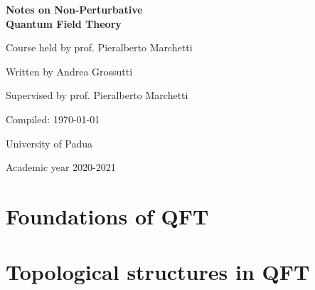 \documentclass[a4paper]{report}
\newcommand{\onlyinsubfile}[1]{#1}
\newcommand{\onlyinmainfile}[1]{

\skipline

\textsf{\color{red} Part of the text is omitted from the compiled subfile, in order to make the compilation faster. You can find it in the main file. To avoid this, remove `` \textnormal{\textbackslash onlyinmainfile\{\ldots\}}'' from the code.}

\skipline

}
\begin{document}
\renewcommand{\onlyinsubfile}[1]{}
\renewcommand{\onlyinmainfile}[1]{#1}

\renewcommand{\todo}[1]{}

\begin{titlepage}
\begin{center}
       \vspace*{5cm}
       \textbf{\Huge Notes on Non-Perturbative\\[0.3em]
       Quantum Field Theory}
       
       \vspace{1cm}
        {\LARGE Course held by prof. Pieralberto Marchetti}
        
        \vspace{1.5cm}
        {\Large Written by Andrea Grossutti} 
        
        \vspace{1.5cm}
        {\Large Supervised by prof. Pieralberto Marchetti}   
                 
       \vfill
       {\large Compiled: \today} 
           
       \vspace{2cm}        
       {\large University of Padua}  
        
       \vspace{0.8cm}
       {\large Academic year 2020-2021}
\end{center}
\end{titlepage}

\tableofcontents

\part{Foundations of QFT}





\part{Topological structures in QFT}




\nocite{*}
\printbibliography
\end{document}
